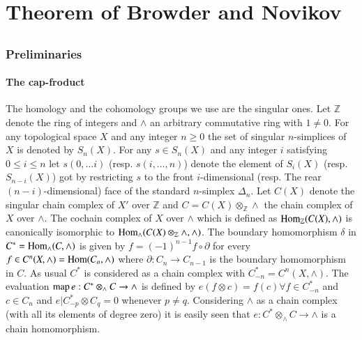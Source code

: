 \part{Theorem of Browder and Novikov}\label{part1}

\chapter{}


\thispagestyle{plain}
\section{Preliminaries}\label{chap1:sec1}\pageoriginale

\subsection{The cap-froduct}\label{chap1:subsec1.1}%

The homology and the cohomology groups we use are the singular
ones. Let $\mathbb{Z}$ denote the ring of integers and $\wedge$ an
arbitrary commutative ring with $1 \neq 0$. For any topological space
$X$ and any integer $n \geq 0$ the set of singular $n$-simplices of $X$
is denoted by $S_n (X)$. For any $s \in S_n (X)$ and any
integer $i$ satisfying $0 \leq i \leq n$ let $s(0, \ldots i)$ (resp. $s
(i,\ldots, n)$) denote the element of $S_i(X)$ (resp. $S_{n-i} (X)$) got
by restricting $s$ to the front $i$-dimensional (resp. The rear
$(n-i)$-dimensional) face of the standard $n$-simplex $\Delta_n$. Let
$C(X)$ denote the singular chain complex of $X'$ over $\mathbb{Z}$ and
$C = C(X) \otimes_{\mathbb{Z}} \wedge$ the chain complex of $X$ over
$\wedge$. The cochain complex of $X$ over $\wedge$ which is defined as
$\operatorname{Hom}_{\mathbb{Z}} (C (X), \wedge)$ is canonically isomorphic to
$\operatorname{Hom}_\wedge (C (X) \otimes_{\mathbb{Z}} \wedge, \wedge)$. The boundary
homomorphism $\delta$ in $C^* = \operatorname{Hom} _\wedge (C,\wedge)$ is given by $f
= (-1)^{n-1} f \circ \partial$ for every $f \in C^n (X, \wedge) = \operatorname{Hom}
(C_n, \wedge)$ where $\partial : C_n \to C_{n-1}$ is the boundary
homomorphism in $C$. As usual $C^*$ is considered as a chain complex
with $C^{*}_{-n} = C^n (X, \wedge)$. The evaluation $\operatorname{map} e: C^*
\otimes_{\wedge} C \to \wedge$ is defined by $e (f \otimes c) = f (c)
\forall f \in C^{*}_{-n}$ and $c \in C_n$ and $e |
C^*_{-p} \otimes C_q =0$ whenever $p\neq q$. Considering $\wedge$ as a
chain complex (with all its elements of degree zero) it is easily seen
that $e: C^* \otimes_{\wedge} C \to \wedge$ is a chain
homomorphism. 

